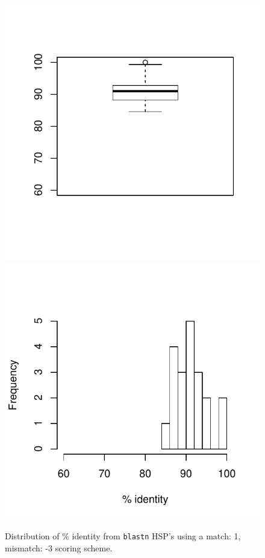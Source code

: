 \documentclass{article}\usepackage[]{graphicx}\usepackage[]{color}
\newenvironment{knitrout}{}{} %
\begin{document}
\begin{figure}
\begin{knitrout}
\color{fgcolor}

{\centering \includegraphics[width=.49\linewidth]{figure/pident_2_fig1} 
\includegraphics[width=.49\linewidth]{figure/pident_2_fig2} 

}



\end{knitrout}
\caption{Distribution of \% identity from \texttt{blastn} HSP's using a match: 1, mismatch: -3 scoring scheme.}
\end{figure}

\end{document}
